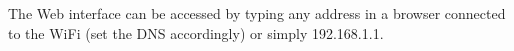 \documentclass[11pt,a4paper]{article}
\begin{document}
The Web interface can be accessed by typing any address in a browser
connected to the WiFi (set the DNS accordingly) or simply 192.168.1.1.






\end{document}
